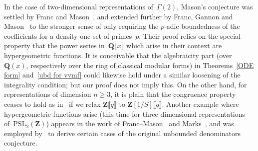 \documentclass[10pt]{amsart}
\def\PSL{\mathrm{PSL}}
\def\Z{\mathbf{Z}}
\def\Q{\mathbf{Q}}
\theoremstyle{remark}
\numberwithin{equation}{subsection}
\def\SL{\mathrm{SL}}
\begin{document}
In the case
of two-dimensional representations of~$\Gamma(2)$, Mason's conjecture was settled by Franc and Mason~\cite{MasonConjectured,FrancMasonDim2}, and extended further by Franc, Gannon and Mason~\cite{FrancGannonMason} to the stronger sense of only requiring the $p$-adic boundedness of the coefficients for a density one set of primes~$p$. Their proof relies on the special property
 that the power series in~$\Q \llbracket x \rrbracket$ which arise in their context are hypergeometric functions.
 It is conceivable that the algebraicity part (over $\Q(x)$, respectively over the ring of classical modular forms) in Theorems~\ref{ODE form} and~\ref{ubd for vvmf} could likewise hold under a similar loosening of the integrality condition; but our proof does not imply this.  On the other hand, for representations of dimension $n \geq 3$, it is plain that the congruence property ceases to hold as in~\cite{FrancMasonDim2} if we relax $\Z\llbracket q \rrbracket$ to $\Z[1/S]\llbracket q \rrbracket$. 
 Another example where hypergeometric functions arise (this time for  three-dimensional representations of~$\PSL_2(\Z)$) 
 appears in the work of
 Franc--Mason~\cite{FrancMasonVvmf} and Marks~\cite{Marks}, and was employed by~\cite{FrancMason} to derive certain cases of the original unbounded denominators conjecture.
\end{document}
